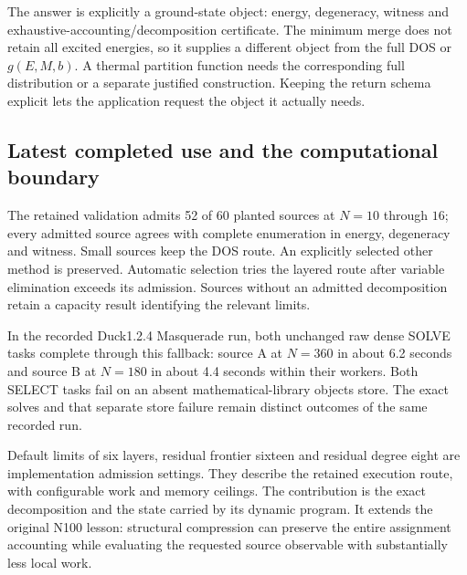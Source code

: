 The answer is explicitly a ground-state object: energy, degeneracy, witness and exhaustive-accounting/decomposition certificate. The minimum merge does not retain all excited energies, so it supplies a different object from the full DOS or $g(E,M,b)$. A thermal partition function needs the corresponding full distribution or a separate justified construction. Keeping the return schema explicit lets the application request the object it actually needs.

\subsection{Latest completed use and the computational boundary}

The retained validation admits 52 of 60 planted sources at $N=10$ through $16$; every admitted source agrees with complete enumeration in energy, degeneracy and witness. Small sources keep the DOS route. An explicitly selected other method is preserved. Automatic selection tries the layered route after variable elimination exceeds its admission. Sources without an admitted decomposition retain a capacity result identifying the relevant limits.

In the recorded Duck1.2.4 Masquerade run, both unchanged raw dense SOLVE tasks complete through this fallback: source A at $N=360$ in about 6.2 seconds and source B at $N=180$ in about 4.4 seconds within their workers. Both SELECT tasks fail on an absent mathematical-library objects store. The exact solves and that separate store failure remain distinct outcomes of the same recorded run.

Default limits of six layers, residual frontier sixteen and residual degree eight are implementation admission settings. They describe the retained execution route, with configurable work and memory ceilings. The contribution is the exact decomposition and the state carried by its dynamic program. It extends the original N100 lesson: structural compression can preserve the entire assignment accounting while evaluating the requested source observable with substantially less local work.
